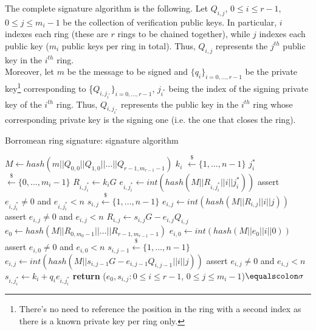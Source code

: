 The complete signature algorithm is the following. Let $Q_{i,j}$, $0 \leq i \leq r-1$, $0 \leq j \leq m_i-1$ be the collection of verification public keys. In particular, $i$ indexes each ring (these are $r$ rings to be chained together), while $j$ indexes each public key ($m_i$ public keys per ring in total). Thus, $Q_{i,j}$ represents the $j^{th}$ public key in the $i^{th}$ ring.\\
Moreover, let $m$ be the message to be signed and $\{q_i\}_{i=0,\dots,r-1}$ be the private key\footnote{There's no need to reference the position in the ring with a second index as there is a known private key per ring only.} corresponding to \{$Q_{i,j_{i^{*}}}\}_{i=0,\dots,r-1}$, $j_{i^{*}}$ being the index of the signing private key of the $i^{th}$ ring. Thus, $Q_{i,j_{i^{*}}}$ represents the public key in the $i^{th}$ ring whose corresponding private key is the signing one (i.e. the one that closes the ring).
\begin{algorithm}[H]
	\caption{Borromean ring signature: signature algorithm}
	\label{alg:Borromean_sign}
	\begin{algorithmic}[1]
		\State $M \gets hash(m||Q_{0,0}||Q_{1,0}||\dots||Q_{r-1,m_{r-1}-1})$
		\State $k_i$ $\xleftarrow{\text{\$}} \{1, ..., n - 1\}$
		\State $j_i^{*}$ $\xleftarrow{\text{\$}} \{0, ..., m_i - 1\}$
		\State $R_{i,j_i^{*}} \gets k_iG$
		\State $e_{i,j_i^{*}} \gets int(hash(M||R_{i,j_i^{*}}||i||j_i^{*}))$
		\State assert $e_{i,j_i^{*}} \neq 0$ and $e_{i,j_i^{*}} < n$
		\State $s_{i,j} \xleftarrow{\text{\$}} \{1, ..., n - 1\}$
		\State $e_{i,j} \gets int(hash(M||R_{i,j}||i||j))$
		\State assert $e_{i,j} \neq 0$ and $e_{i,j} < n$
		\State $R_{i,j} \gets s_{i,j}G - e_{i,j}Q_{i,j}$
		\EndFor
		\EndIf
		\EndFor
		\State $e_0 \gets hash(M||R_{0,m_0-1}||\dots||R_{r-1,m_{r-1}-1})$
		\State $e_{i,0} \gets int(hash(M||e_0||i||0))$
		\State assert $e_{i,0} \neq 0$ and $e_{i,0} < n$
		\State $s_{i,j-1} \xleftarrow{\text{\$}} \{1, ..., n - 1\}$
		\State $e_{i,j} \gets int(hash(M|| s_{i,j-1}G - e_{i,j-1}Q_{i,j-1}||i||j))$
		\State assert $e_{i,j} \neq 0$ and $e_{i,j} < n$
		\EndFor
		\State $s_{i,j_i^{*}} \gets k_i + q_ie_{i,j_i^{*}}$
		\EndFor
		\State \textbf{return} ($e_0, s_{i,j}: 0 \leq i \leq r-1$, $0 \leq j \leq m_i-1$)$\equalscolon \sigma$
		\EndProcedure
	\end{algorithmic}
\end{algorithm}
